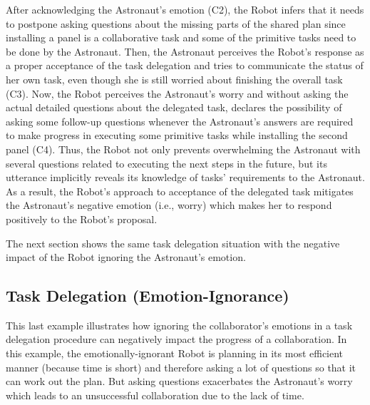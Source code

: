 After acknowledging the Astronaut's emotion (C2), the Robot infers that it needs
to postpone asking questions about the missing parts of the shared plan since
installing a panel is a collaborative task and some of the primitive tasks need
to be done by the Astronaut. Then, the Astronaut perceives the Robot's response
as a proper acceptance of the task delegation and tries to communicate the
status of her own task, even though she is still worried about finishing the
overall task (C3). Now, the Robot perceives the Astronaut's worry and without
asking the actual detailed questions about the delegated task, declares the
possibility of asking some follow-up questions whenever the Astronaut's answers
are required to make progress in executing some primitive tasks while installing
the second panel (C4). Thus, the Robot not only prevents overwhelming the
Astronaut with several questions related to executing the next steps in the
future, but its utterance implicitly reveals its knowledge of tasks'
requirements to the Astronaut. As a result, the Robot's approach to acceptance
of the delegated task mitigates the Astronaut's negative emotion (i.e., worry)
which makes her to respond positively to the Robot's proposal.

The next section shows the same task delegation situation with the negative
impact of the Robot ignoring the Astronaut's emotion.

\subsection{Task Delegation (Emotion-Ignorance)}
\label{sec:exp4}

This last example illustrates how ignoring the collaborator's emotions in a task
delegation procedure can negatively impact the progress of a collaboration. In
this example, the emotionally-ignorant Robot is planning in its most efficient
manner (because time is short) and therefore asking a lot of questions so that
it can work out the plan. But asking questions exacerbates the Astronaut's worry
which leads to an unsuccessful collaboration due to the lack of time.

